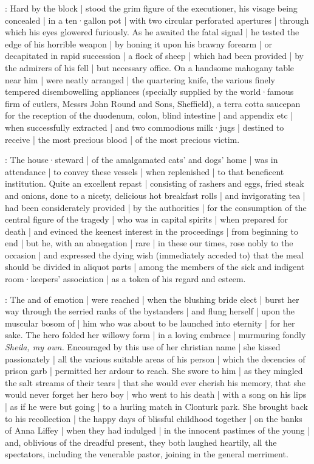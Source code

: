 :
Hard by the block |
stood the grim figure of the executioner,
his visage being concealed |
in a ten·gallon pot |
with two circular perforated apertures |
through which his eyes glowered furiously.
As he awaited the fatal signal |
he tested the edge of his horrible weapon |
by honing it upon his brawny forearm |
or decapitated in rapid succession |
a flock of sheep |
which had been provided |
by the admirers of his fell |
but necessary office.
On a handsome mahogany table near him |
were neatly arranged |
the quartering knife,
the various finely tempered disembowelling appliances
(specially supplied by the world·famous firm of cutlers,
Messrs John Round and Sons,
Sheffield),
a terra cotta saucepan for the reception of the duodenum,
colon,
blind intestine |
and appendix etc |
when successfully extracted |
and two commodious milk·jugs |
destined to receive |
the most precious blood |
of the most precious victim.

:
The house·steward |
of the amalgamated cats' and dogs' home |
was in attendance |
to convey these vessels |
when replenished |
to that beneficent institution.
Quite an excellent repast |
consisting of rashers and eggs,
fried steak and onions,
done to a nicety,
delicious hot breakfast rolls |
and invigorating tea |
had been considerately provided |
by the authorities |
for the consumption of the central figure of the tragedy
 |
who was in capital spirits |
when prepared for death |
and evinced the keenest interest in the proceedings |
from beginning to end |
but he,
with an abnegation |
rare |
in these our times,
rose nobly to the occasion |
and expressed the dying wish
(immediately acceded to)
that the meal should be divided in aliquot parts |
among the members of the sick and indigent room·keepers' association |
as a token of his regard and esteem.

:
The  and  of emotion |
were reached |
when the blushing bride elect |
burst her way through the serried ranks of the bystanders |
and flung herself |
upon the muscular bosom of |
him who was about to be launched into eternity |
for her sake.
The hero folded her willowy form |
in a loving embrace |
murmuring fondly
\emph{Sheila,
my own.}
Encouraged by this use of her christian name |
she kissed passionately |
all the various suitable areas of his person |
which the decencies of prison garb |
permitted her ardour to reach.
She swore to him |
as they mingled the salt streams of their tears |
that she would ever cherish his memory,
that she would never forget her hero boy |
who went to his death |
with a song on his lips |
as if he were but going |
to a hurling match in Clonturk park.
She brought back to his recollection |
the happy days of blissful childhood together |
on the banks of Anna Liffey |
when they had indulged |
in the innocent pastimes of the young |
and,
oblivious of the dreadful present,
they both laughed heartily,
all the spectators,
including the venerable pastor,
joining in the general merriment.

